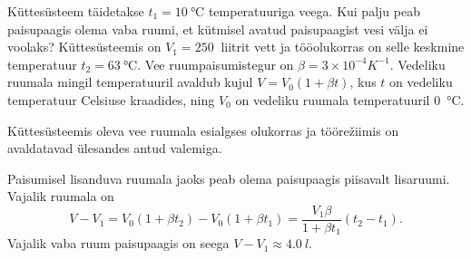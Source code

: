 
Küttesüsteem täidetakse $t_1=\SI{10}{\degreeCelsius}$ temperatuuriga veega. Kui palju peab paisupaagis olema vaba ruumi, et kütmisel avatud paisupaagist vesi välja ei voolaks? Küttesüsteemis on $V_1=\SI{250}{}$ liitrit vett ja tööolukorras on selle keskmine temperatuur $t_2=\SI{63}{\degreeCelsius}$. Vee ruumpaisumistegur on $\beta=3\times 10^{-4}K^{-1}$. Vedeliku ruumala mingil temperatuuril avaldub kujul $V=V_{0}(1+\beta t)$, kus $t$ on vedeliku temperatuur Celsiuse kraadides, ning $V_{0}$ on vedeliku ruumala temperatuuril \SI{0}{\degreeCelsius}.

\hint
Küttesüsteemis oleva vee ruumala esialgses olukorras ja töörežiimis on avaldatavad ülesandes antud valemiga.

\solu
Paisumisel lisanduva ruumala jaoks peab olema paisupaagis piisavalt lisaruumi. Vajalik ruumala on
\[
V-V_{1}=V_{0}\left(1+\beta t_{2}\right)-V_{0}\left(1+\beta t_{1}\right)=\frac{V_{1} \beta}{1+\beta t_{1}}\left(t_{2}-t_{1}\right).
\]
Vajalik vaba ruum paisupaagis on seega $V - V_1 \approx \SI{4,0}{l}$.
\probend